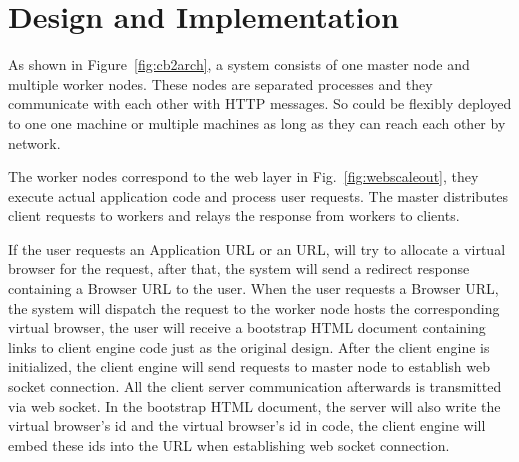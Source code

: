 \section{Design and Implementation}
\label{sec:implementation}
As shown in Figure~\ref{fig:cb2arch}, 
a \cb{} system consists of one master node and multiple worker nodes.
These nodes are separated processes and they communicate with each other
with HTTP messages.
So \cb{} could be flexibly deployed  
to one one machine or multiple machines 
as long as they can reach each other by network.

The worker nodes correspond to the web layer in Fig.~\ref{fig:webscaleout},
they execute actual application code and process user requests.
The master distributes client requests to workers and relays the 
response from workers to clients.



If the user requests an Application URL or an \appins{} URL, 
\cb{} will try to allocate a virtual browser for the request,
after that, the system will send a redirect response containing a Browser URL to the user.
When the user requests a Browser URL,
the system will dispatch the request to the worker node hosts the corresponding virtual browser,
the user will receive a bootstrap HTML document containing links to client engine code just as
the original design.
After the client engine is initialized, the client engine will send requests
to master node to establish web socket connection.
All the client server communication afterwards is transmitted via web socket.
In the bootstrap HTML document, 
the server will also write the virtual browser's id and the virtual browser's 
\appins{} id in \js{} code,
the client engine will embed these ids into the URL when establishing web socket
connection.



\newarchitectureoverview{}

